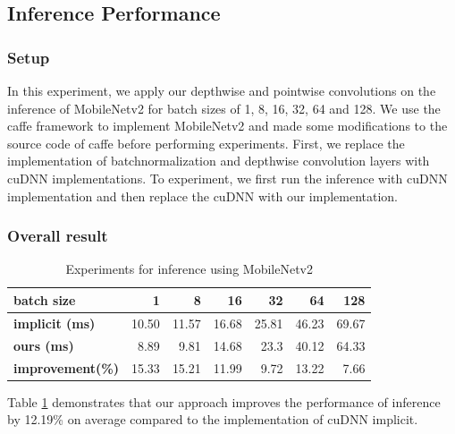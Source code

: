 \subsection{Inference Performance}
\label{sec:inferexp}
\subsubsection{Setup} In this experiment, we apply our depthwise and pointwise convolutions on the inference of MobileNetv2 for batch sizes of 1, 8, 16, 32, 64 and 128.
We use the caffe framework to implement MobileNetv2 and made some modifications to the source code of caffe before performing experiments. 
First, we replace the implementation of batchnormalization and depthwise convolution layers with cuDNN implementations. 
To experiment, we first run the inference with cuDNN implementation and then replace the cuDNN with our implementation.

\subsubsection{Overall result}
\begin{table}[]
    \caption{Experiments for inference using MobileNetv2}
    \label{tab:infertime}
    \centering
    \begin{threeparttable}
    \begin{tabular}{l|rrrrrr}
    \toprule
    \textbf{batch size} & 1 & 8 & 16& 32 &64 & 128\\
    \midrule
    \textbf{implicit (ms)} & 10.50  & 11.57 & 16.68 & 25.81 &46.23 &69.67  \\
    \textbf{ours (ms)} &8.89   &9.81    & 14.68  & 23.3 &40.12 &64.33 \\
    \textbf{improvement(\%)} &15.33   &15.21    & 11.99  & 9.72 &13.22 &7.66 \\
    
    \bottomrule
    \end{tabular}
    \footnotesize
    \end{threeparttable}
    \vspace{-5mm}
\end{table}
Table \ref{tab:infertime} demonstrates that our approach improves the performance of inference by 12.19\% on average compared to the implementation of cuDNN implicit.